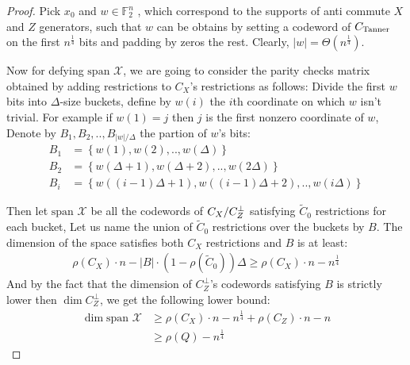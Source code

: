 \documentclass[manuscript,screen,review]{acmart}
\begin{document}
\begin{proof}
   Pick $x_{0}$ and $w \in \mathbb{F}_{2}^{n}$ , which correspond to the supports of anti commute $X$ and $Z$ generators, such that $w$ can be obtains by setting a codeword of $C_{\text{Tanner}}$ on the first $n^{\frac{1}{4}}$ bits and padding by zeros the rest. Clearly, $|w| = \Theta(n^{\frac{1}{4}})$.

  Now for defying $\text{span }\mathcal{X}$, we are going to consider the parity checks matrix obtained by adding restrictions to $C_{X}$'s restrictions as follows: Divide the first $w$ bits into $\Delta$-size buckets, define by $w(i)$ the $i$th coordinate on which $w$ isn't trivial. For example if $w(1)=j$ then $j$ is the first nonzero coordinate of $w$, Denote by $B_{1},B_2,.., B_{|w|/\Delta}$ the partion of $w$'s bits: 
  \begin{equation*}
    \begin{split}
      B_{1} &= \left\{w(1), w(2), ..,w(\Delta)\right\}\\
      B_{2} &= \left\{w(\Delta + 1), w(\Delta + 2), ..,w(2\Delta) \right\}\\
      B_{i} &= \left\{w((i-1)\Delta + 1), w((i-1)\Delta + 2), ..,w(i\Delta) \right\}
    \end{split}
  \end{equation*}

  Then let $\text{span }\mathcal{X}$ be all the codewords of $C_{X}/C_{Z}^\perp$ satisfying $\tilde{C}_{0}$ restrictions for each bucket, Let us name the union of $\tilde{C}_{0}$ restrictions over the buckets by $B$. The dimension of the space satisfies both $C_{X}$ restrictions and $B$ is at least:
  \begin{equation*}
    \begin{split}
      \rho(C_{X})\cdot n - |B|\cdot (1 - \rho(\tilde{C}_{0}))\Delta \ge \rho(C_{X})\cdot n - n^{\frac{1}{4}}
    \end{split}
  \end{equation*}
  And by the fact that the dimension of $C_{Z}^\perp$'s codewords satisfying $B$ is strictly lower then $\dim C_{Z}^\perp$, we get the following lower bound:
  \begin{equation*}
    \begin{split}
      \dim \text{span } \mathcal{X} & \ge \rho(C_{X})\cdot n - n^{\frac{1}{4}} + \rho(C_{Z})\cdot n - n \\
     & \ge \rho (Q) - n^{\frac{1}{4}}
    \end{split}
  \end{equation*}
\end{proof}
\end{document}
